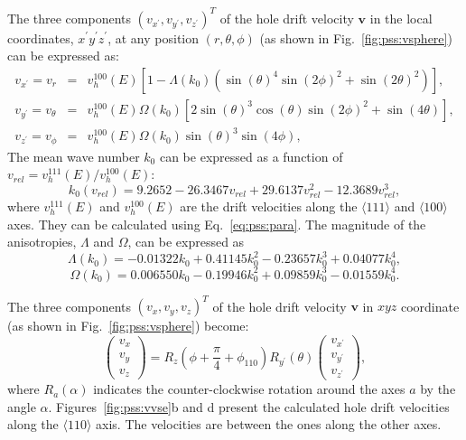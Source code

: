 The three components $(v_{x^{\prime}}, v_{y^{\prime}},
v_{z^{\prime}})^{T}$ of the hole drift velocity $\mathbf{v}$ in the
local coordinates, $x^{\prime}y^{\prime}z^{\prime}$, at any position
$(r, \theta, \phi)$ (as shown in Fig.~\ref{fig:pss:vsphere}) can be
expressed as:
\begin{equation} 
\label{eq:pss:vsphere} 
\begin{array}{rcl} 
v_{x^{\prime}} = v_{r} &=& v^{100}_{h}(E)[1-\Lambda(k_{0})(\sin(\theta)^{4}\sin(2\phi)^{2} + \sin(2\theta)^{2})],\\ 
v_{y^{\prime}} = v_{\theta} &=& v^{100}_{h}(E)\Omega(k_{0})[2\sin(\theta)^{3}\cos(\theta)\sin(2\phi)^{2} + \sin(4\theta)],\\ 
v_{z^{\prime}} = v_{\phi} &=& v^{100}_{h}(E)\Omega(k_{0})\sin(\theta)^{3}\sin(4\phi), 
\end{array} 
\end{equation} 
The mean wave number $k_{0}$ can be expressed as a function of
$v_{rel} = v^{111}_{h}(E)/v^{100}_{h}(E)$:
\begin{equation} 
\label{eq:pss:k0} 
k_{0}(v_{rel}) = 9.2652 - 26.3467v_{rel} + 29.6137v_{rel}^{2} - 12.3689v_{rel}^{3}, 
\end{equation} 
where $v^{111}_{h}(E)$ and $v^{100}_{h}(E)$ are the drift velocities
along the $\langle111\rangle$ and $\langle100\rangle$ axes. They can
be calculated using Eq.~\ref{eq:pss:para}. The magnitude of the
anisotropies, $\Lambda$ and $\Omega$, can be expressed as
\begin{equation} 
\label{eq:pss:lamb} 
\Lambda(k_{0}) = -0.01322k_{0} + 0.41145k_{0}^{2} - 0.23657k_{0}^{3} + 0.04077k_{0}^{4}, 
\end{equation} 
\begin{equation} 
\label{eq:pss:ome} 
\Omega(k_{0}) = 0.006550k_{0} - 0.19946k_{0}^{2} + 0.09859k_{0}^{3} - 0.01559k_{0}^{4}. 
\end{equation} 
 
The three components $(v_{x}, v_{y}, v_{z})^{T}$ of the hole drift
velocity $\mathbf{v}$ in $xyz$ coordinate (as shown in
Fig.~\ref{fig:pss:vsphere}) become:
\begin{equation} 
\label{eq:pss:v2v}   
\left( 
\begin{array}{c} 
v_{x} \\ v_{y} \\ v_{z} 
\end{array} 
\right) = R_{z}(\phi + \frac{\pi}{4} + \phi_{110}) R_{y^{\prime}}(\theta) \left(  
\begin{array}{c} 
v_{x^{\prime}} \\ v_{y^{\prime}} \\ v_{z^{\prime}} 
\end{array} \right), 
\end{equation} 
where $R_a(\alpha)$ indicates the counter-clockwise rotation around
the axes $a$ by the angle $\alpha$.  Figures~\ref{fig:pss:vvse}b and d
present the calculated hole drift velocities along the $\langle 110
\rangle$ axis. The velocities are between the ones along the other
axes.
 
